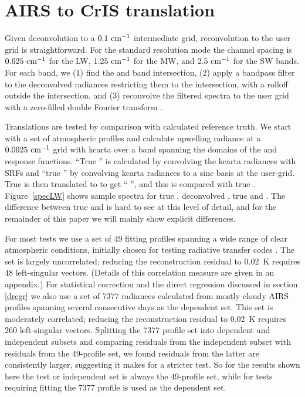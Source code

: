 \documentclass[11pt]{article}
\begin{document}
\FloatBarrier
\section{AIRS to CrIS translation}
\label{airs2cris}

Given {\airs} deconvolution to a $0.1~\mbox{cm$^{-1}$}$ intermediate grid,
reconvolution to the {\cris} user grid is straightforward.  For the
{\cris} standard resolution mode the channel spacing is $0.625~\mbox{cm$^{-1}$}$
for the LW, $1.25~\mbox{cm$^{-1}$}$ for the MW, and $2.5~\mbox{cm$^{-1}$}$ for the SW bands.
For each {\cris} band, we (1) find the {\airs} and {\cris} band
intersection, (2) apply a bandpass filter to the deconvolved {\airs}
radiances restricting them to the intersection, with a rolloff
outside the intersection, and (3) reconvolve the filtered spectra to
the {\cris} user grid with a zero-filled double Fourier transform
\cite{motfft}. 

Translations are tested by comparison with calculated reference
truth.  We start with a set of atmospheric profiles and calculate
upwelling radiance at a $0.0025~\mbox{cm$^{-1}$}$ grid with kcarta \cite{kcarta1}
over a band spanning the domains of the {\airs} and {\cris} response
functions.  ``True {\airs}'' is calculated by convolving the kcarta
radiances with {\airs} SRFs and ``true {\cris}'' by convolving
kcarta radiances to a sinc basis at the {\cris} user-grid.  True
{\airs} is then translated to {\cris} to get ``{\airs} {\cris}'',
and this is compared with true {\cris}.  Figure~\ref{specLW} shows
sample spectra for true {\airs}, deconvolved {\airs}, true {\cris}
and {\airs} {\cris}.  The difference between true {\cris} and
{\airs} {\cris} is hard to see at this level of detail, and for the
remainder of this paper we will mainly show explicit differences.

For most tests we use a set of 49 fitting profiles spanning a wide
range of clear atmospheric conditions, initially chosen for testing
radiative transfer codes \cite{sarta1,sarta2}.  The set is largely
uncorrelated; reducing the reconstruction residual to 0.02~K
requires 48 left-singular vectors.  (Details of this correlation
measure are given in an appendix.)  For statistical correction and
the direct regression discussed in section \ref{dregr} we also use a
set of 7377 radiances calculated from mostly cloudy AIRS profiles
spanning several consecutive days as the dependent set.  This set is
moderately correlated; reducing the reconstruction residual to
0.02~K requires 260 left-singular vectors.  Splitting the 7377
profile set into dependent and independent subsets and comparing
residuals from the independent subset with residuals from the
49-profile set, we found residuals from the latter are consistently
larger, suggesting it makes for a stricter test.  So for the results
shown here the test or independent set is always the 49-profile set,
while for tests requiring fitting the 7377 profile is used as the
dependent set.
\end{document}
